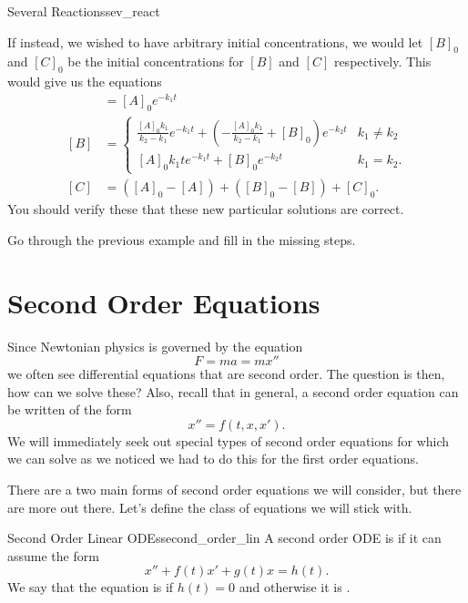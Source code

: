 \begin{ex}{Several Reactions}{sev_react}
\begin{figure}[H]
        \end{figure}

        If instead, we wished to have arbitrary initial concentrations, we would let $[B]_0$ and $[C]_0$ be the initial concentrations for $[B]$ and $[C]$ respectively.  This would give us the equations
        \begin{align*}
            [A]&=[A]_0e^{-k_1t}\\
            [B]&=\begin{cases}
                \frac{[A]_0k_1}{k_2-k_1}e^{-k_1t}+\left( -\frac{[A]_0k_1}{k_2-k_1}+[B]_0\right)e^{-k_2t} & k_1\neq k_2\\
                [A]_0k_1te^{-k_1t}+[B]_0e^{-k_2t} & k_1=k_2.
            \end{cases}\\
            [C]&=([A]_0-[A])+([B]_0-[B])+[C]_0.
        \end{align*}
        You should verify these that these new particular solutions are correct.
        \end{ex}
        
        \begin{exercise}
        Go through the previous example and fill in the missing steps.
        \end{exercise}
        
        \section{Second Order Equations}
        
        Since Newtonian physics is governed by the equation
        \[
        F=ma=mx''
        \]
        we often see differential equations that are second order.  The question is then, how can we solve these?  Also, recall that in general, a second order equation can be written of the form
        \[
            x'' = f(t,x,x').
        \]
        We will immediately seek out special types of second order equations for which we can solve as we noticed we had to do this for the first order equations.
        
        There are a two main forms of second order equations we will consider, but there are more out there. Let's define the class of equations we will stick with.
        
        \begin{df}{Second Order Linear ODEs}{second_order_lin}
            A second order ODE is  if it can assume the form 
            \[
            x''+f(t)x'+g(t)x=h(t).
            \]
            We say that the equation is  if $h(t)=0$ and otherwise it is .
        \end{df}
        
